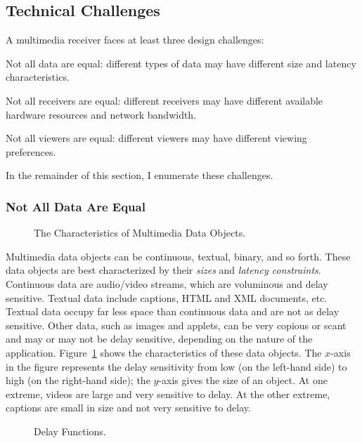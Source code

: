 \subsection{Technical Challenges}
\label{sec-challenges}

A multimedia receiver faces at least three design challenges:
\begin{jlist}
\item Not all data are equal: different types of data may have different
size and latency characteristics.
\item Not all receivers are equal: different receivers may have different
available hardware resources and network bandwidth.
\item Not all viewers are equal: different viewers may have different
viewing preferences.
\end{jlist}
In the remainder of this section, I enumerate these challenges.

\subsubsection{Not All Data Are Equal}

\begin{figure}[t]
\epsfxsize=260pt
\epsfysize=160pt
\centerline{}
\caption{The Characteristics of Multimedia Data Objects.}
\label{fig-dtv-data}
\end{figure}

Multimedia data objects can be continuous, textual, binary,
and so forth.  These data objects are
best characterized by their {\it sizes}
and {\it latency constraints}. Continuous       
data are audio/video streams, which are voluminous and
delay sensitive.
Textual data include captions, HTML and XML documents,
etc. Textual data occupy far less space than continuous data
and are not as delay sensitive. Other data, such as images and applets,
can be very copious or scant and may or may not be delay sensitive,
depending on the nature of the application.
Figure~\ref{fig-dtv-data} shows the characteristics of
these data objects. The $x$-axis in the figure represents the
delay sensitivity from low (on the left-hand side) to high
(on the right-hand side); the $y$-axis gives the size of an object.
At one extreme, videos are large and very sensitive to
delay. At the other extreme, captions are small in size and not very
sensitive to delay.
                       
\begin{figure}[t]
\epsfysize=160pt
\epsfxsize=280pt
\centerline{}
\caption{Delay Functions.}
\label{fig-delay-fs}
\end{figure}


